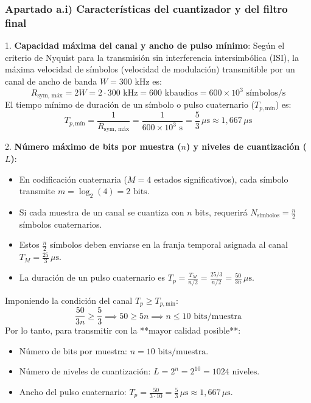 \begin{resolucion}
{\begin{resolucion}
\subsubsection*{Apartado a.i) Características del cuantizador y del filtro final}

1. \textbf{Capacidad máxima del canal y ancho de pulso mínimo}:
   Según el criterio de Nyquist para la transmisión sin interferencia intersimbólica (ISI), la máxima velocidad de símbolos (velocidad de modulación) transmitible por un canal de ancho de banda $W = 300\text{ kHz}$ es:
   \[
   R_{\text{sym, máx}} = 2W = 2 \cdot 300\text{ kHz} = 600\text{ kbaudios} = 600\times 10^3 \text{ símbolos/s}
   \]
   El tiempo mínimo de duración de un símbolo o pulso cuaternario ($T_{p, \text{mín}}$) es:
   \[
   T_{p, \text{mín}} = \frac{1}{R_{\text{sym, máx}}} = \frac{1}{600\times 10^3\text{ s}} = \frac{5}{3} \, \mu\text{s} \approx 1{,}667 \, \mu\text{s}
   \]

2. \textbf{Número máximo de bits por muestra ($n$) y niveles de cuantización ($L$)}:
   \begin{itemize}
       \item En codificación cuaternaria ($M = 4$ estados significativos), cada símbolo transmite $m = \log_2(4) = 2\text{ bits}$.
       \item Si cada muestra de un canal se cuantiza con $n$ bits, requerirá $N_{\text{símbolos}} = \frac{n}{2}$ símbolos cuaternarios.
       \item Estos $\frac{n}{2}$ símbolos deben enviarse en la franja temporal asignada al canal $T_M = \frac{25}{3} \, \mu\text{s}$.
       \item La duración de un pulso cuaternario es $T_p = \frac{T_M}{n/2} = \frac{25/3}{n/2} = \frac{50}{3n} \, \mu\text{s}$.
   \end{itemize}
   Imponiendo la condición del canal $T_p \ge T_{p, \text{mín}}$:
   \[
   \frac{50}{3n} \ge \frac{5}{3} \implies 50 \ge 5n \implies n \le 10\text{ bits/muestra}
   \]
   Por lo tanto, para transmitir con la **mayor calidad posible**:
   \begin{itemize}
       \item Número de bits por muestra: $n = 10\text{ bits/muestra}$.
       \item Número de niveles de cuantización: $L = 2^n = 2^{10} = 1024\text{ niveles}$.
       \item Ancho del pulso cuaternario: $T_p = \frac{50}{3 \cdot 10} = \frac{5}{3} \, \mu\text{s} \approx 1{,}667 \, \mu\text{s}$.
   \end{itemize}


\end{resolucion}}
\end{resolucion}
